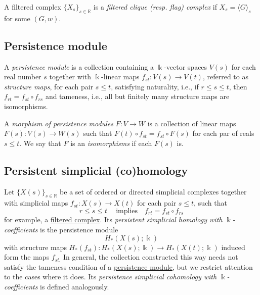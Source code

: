 \documentclass{amsart}
\begin{document}
	A filtered complex $\{X_s\}_{s \in \mathbb R}$ is a \textit{filtered clique (resp. flag) complex} if $X_s = \langle G \rangle_s$ for some $(G,w)$.
	
	\subsection*{Persistence module} \label{persistence module}
	
	A \textit{persistence module} is a collection containing a $\Bbbk$-vector spaces $V(s)$ for each real number $s$ together with $\Bbbk$-linear maps $f_{st} : V(s) \to V(t)$, referred to as \textit{structure maps}, for each pair $s \leq t$, satisfying	naturality, i.e., if $r \leq s \leq t$, then $f_{rt} = f_{st} \circ f_{rs}$ and tameness, i.e., all but finitely many structure maps are isomorphisms.
	
	A \textit{morphism of persistence modules} $F : V \to W$ is a collection of linear maps $F(s) : V(s) \to W(s)$ such that $F(t) \circ f_{st} = f_{st} \circ F(s)$ for each par of reals $s \leq t$.	We say that $F$ is an \textit{isomorphisms} if each $F(s)$ is.
	
	\subsection*{Persistent simplicial (co)homology} \label{persistent simplicial (co)homology}
	
	Let $\{X(s)\}_{s \in \mathbb R} $ be a set of ordered or directed simplicial complexes together with simplicial maps $f_{st} : X(s) \to X(t)$ for each pair $s \leq t$, such that 
	\begin{equation*}
	r \leq s \leq t\ \quad\text{implies} \quad f_{rt} = f_{st} \circ f_{rs}
	\end{equation*}
	for example, a \hyperref[filtered complex]{filtered complex}. Its \textit{persistent simplicial homology with $\Bbbk$-coefficients} is the persistence module
	\begin{equation*}
	H_*(X(s); \Bbbk)
	\end{equation*}
	with structure maps $H_*(f_{st}) : H_*(X(s); \Bbbk) \to H_*(X(t); \Bbbk)$ induced form the maps $f_{st.}$ In general, the collection constructed this way needs not satisfy the tameness condition of a \hyperref[persistence module]{persistence module}, but we restrict attention to the cases where it does. Its \textit{persistence simplicial cohomology with $\Bbbk$-coefficients} is defined analogously.
	
\end{document}
